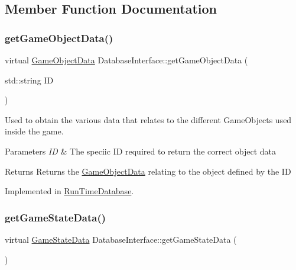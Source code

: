 \subsection{Member Function Documentation}
\mbox{\label{class_database_interface_a515afa17b15a4b111ebc1a43e1d0218e}} 
\subsubsection{\texorpdfstring{get\+Game\+Object\+Data()}{getGameObjectData()}}
{\footnotesize\ttfamily virtual \hyperlink{struct_game_object_data}{Game\+Object\+Data} Database\+Interface\+::get\+Game\+Object\+Data (\begin{DoxyParamCaption}\item[{std\+::string}]{ID }\end{DoxyParamCaption})\hspace{0.3cm}{\ttfamily [pure virtual]}}



Used to obtain the various data that relates to the different Game\+Objects used inside the game. 


\begin{DoxyParams}{Parameters}
{\em ID} & The speciic ID required to return the correct object data \\
\hline
\end{DoxyParams}
\begin{DoxyReturn}{Returns}
Returns the \hyperlink{struct_game_object_data}{Game\+Object\+Data} relating to the object defined by the ID 
\end{DoxyReturn}


Implemented in \hyperlink{class_run_time_database_aabe246e23f6f8ded2c3b61fcfa396f2a}{Run\+Time\+Database}.

\mbox{\label{class_database_interface_a5972ccdce7669da4eef8ab82c69fe073}} 
\subsubsection{\texorpdfstring{get\+Game\+State\+Data()}{getGameStateData()}}
{\footnotesize\ttfamily virtual \hyperlink{struct_game_state_data}{Game\+State\+Data} Database\+Interface\+::get\+Game\+State\+Data (\begin{DoxyParamCaption}{ }\end{DoxyParamCaption})\hspace{0.3cm}{\ttfamily [pure virtual]}}



